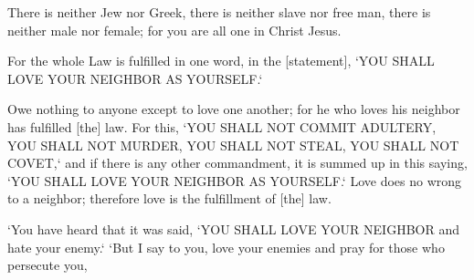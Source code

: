 \begin{scripture}[Galatians 3:28]
    There is neither Jew nor Greek, there is neither slave nor free man, there is neither male nor female; for you are all one in Christ Jesus.
\end{scripture}

\begin{scripture}[Galatians 5:14]
    For the whole Law is fulfilled in one word, in the [statement], `YOU SHALL LOVE YOUR NEIGHBOR AS YOURSELF.`
\end{scripture}

\begin{scripture}[Romans 13:8-10]
    Owe nothing to anyone except to love one another; for he who loves his neighbor has fulfilled [the] law.
    For this, `YOU SHALL NOT COMMIT ADULTERY, YOU SHALL NOT MURDER, YOU SHALL NOT STEAL, YOU SHALL NOT COVET,` and if there is any other commandment, it is summed up in this saying, `YOU SHALL LOVE YOUR NEIGHBOR AS YOURSELF.`
    Love does no wrong to a neighbor; therefore love is the fulfillment of [the] law.
\end{scripture}

\begin{scripture}[Matthew 5:43-44]
    `You have heard that it was said, `YOU SHALL LOVE YOUR NEIGHBOR and hate your enemy.`
    `But I say to you, love your enemies and pray for those who persecute you,
\end{scripture}
